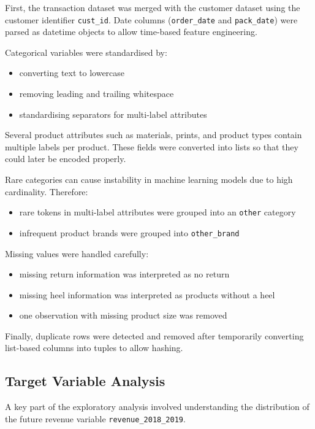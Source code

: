 \documentclass{article}
\begin{document}
First, the transaction dataset was merged with the customer dataset using the customer identifier \texttt{cust\_id}. Date columns (\texttt{order\_date} and \texttt{pack\_date}) were parsed as datetime objects to allow time-based feature engineering.

Categorical variables were standardised by:

\begin{itemize}
\item converting text to lowercase
\item removing leading and trailing whitespace
\item standardising separators for multi-label attributes
\end{itemize}

Several product attributes such as materials, prints, and product types contain multiple labels per product. These fields were converted into lists so that they could later be encoded properly.

Rare categories can cause instability in machine learning models due to high cardinality. Therefore:

\begin{itemize}
\item rare tokens in multi-label attributes were grouped into an \texttt{other} category
\item infrequent product brands were grouped into \texttt{other\_brand}
\end{itemize}

Missing values were handled carefully:

\begin{itemize}
\item missing return information was interpreted as no return
\item missing heel information was interpreted as products without a heel
\item one observation with missing product size was removed
\end{itemize}

Finally, duplicate rows were detected and removed after temporarily converting list-based columns into tuples to allow hashing.

\subsection{Target Variable Analysis}

A key part of the exploratory analysis involved understanding the distribution of the future revenue variable \texttt{revenue\_2018\_2019}.
\end{document}
